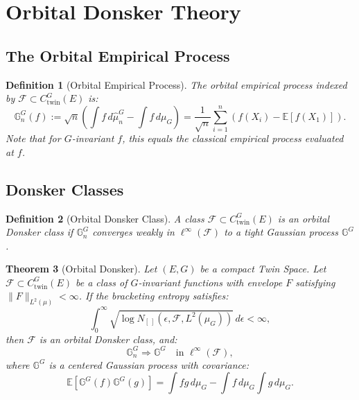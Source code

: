 \documentclass[11pt]{article}
\newtheorem{theorem}{Theorem}[section]
\newtheorem{definition}[theorem]{Definition}
\newcommand{\E}{\mathbb{E}}
\begin{document}
\section{Orbital Donsker Theory}
\label{sec:donsker}

\subsection{The Orbital Empirical Process}

\begin{definition}[Orbital Empirical Process]\label{def:orbital_process}
The orbital empirical process indexed by $\mathcal{F} \subset C_{\mathrm{twin}}^G(E)$ is:
\begin{equation}\label{eq:orbital_process}
\mathbb{G}_n^G(f) := \sqrt{n} \left( \int f \, d\hat{\mu}_n^G - \int f \, d\mu_G \right) = \frac{1}{\sqrt{n}} \sum_{i=1}^n (f(X_i) - \E[f(X_1)]).
\end{equation}
Note that for $G$-invariant $f$, this equals the classical empirical process evaluated at $f$.
\end{definition}

\subsection{Donsker Classes}

\begin{definition}[Orbital Donsker Class]\label{def:donsker_class}
A class $\mathcal{F} \subset C_{\mathrm{twin}}^G(E)$ is an orbital Donsker class if $\mathbb{G}_n^G$ converges weakly in $\ell^\infty(\mathcal{F})$ to a tight Gaussian process $\mathbb{G}^G$.
\end{definition}

\begin{theorem}[Orbital Donsker]\label{thm:orbital_donsker}
Let $(E, G)$ be a compact Twin Space. Let $\mathcal{F} \subset C_{\mathrm{twin}}^G(E)$ be a class of $G$-invariant functions with envelope $F$ satisfying $\|F\|_{L^2(\mu)} < \infty$. If the bracketing entropy satisfies:
\begin{equation}\label{eq:bracketing}
\int_0^\infty \sqrt{\log N_{[\,]}(\epsilon, \mathcal{F}, L^2(\mu_G))} \, d\epsilon < \infty,
\end{equation}
then $\mathcal{F}$ is an orbital Donsker class, and:
\begin{equation}\label{eq:donsker_convergence}
\mathbb{G}_n^G \Rightarrow \mathbb{G}^G \quad \text{in } \ell^\infty(\mathcal{F}),
\end{equation}
where $\mathbb{G}^G$ is a centered Gaussian process with covariance:
\begin{equation}\label{eq:gaussian_cov}
\E[\mathbb{G}^G(f) \mathbb{G}^G(g)] = \int fg \, d\mu_G - \int f \, d\mu_G \int g \, d\mu_G.
\end{equation}
\end{theorem}
\end{document}
